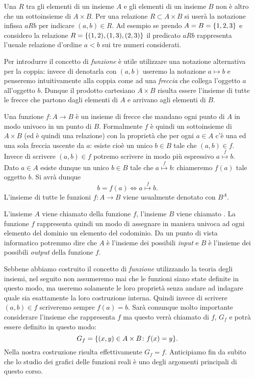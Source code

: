 Una  $R$ tra gli elementi di un insieme $A$ e gli elementi
di un insieme $B$ non è altro che un sottoinsieme di $A\times B$.
Per una relazione $R\subset A\times B$ si userà la notazione infissa
$aRb$ per indicare $(a,b)\in R$.
Ad esempio se prendo $A=B={\left\{ 1,2,3 \right\}}$ e considero la relazione $R={\left\{ (1,2),(1,3),(2,3) \right\}}$
il predicato $aRb$ rappresenta l'usuale relazione d'ordine $a<b$ sui
tre numeri considerati.

Per introdurre il concetto di \emph{funzione} è utile
utilizzare una notazione alternativa per la coppia: invece di denotarla
con $(a,b)$ useremo la notazione $a \mapsto b$ e penseremo intuitivamente
alla coppia come ad una \emph{freccia} che collega l'oggetto $a$
all'oggetto $b$. Dunque il prodotto cartesiano
$A\times B$ risulta essere l'insieme di tutte le frecce che partono dagli
elementi di $A$ e arrivano agli elementi di $B$.

Una funzione $f\colon A \to B$ è un insieme di frecce che mandano
ogni punto di $A$ in modo univoco in un punto di $B$. Formalmente
$f$ è quindi un sottoinsieme di $A\times B$
(ed è quindi una relazione) con la proprietà che
per ogni $a\in A$ c'è una ed una sola freccia uscente da $a$:
esiste cioè un unico $b\in B$ tale che $(a,b)\in f$.
Invece di scrivere $(a,b)\in f$ potremo scrivere in modo più espressivo
$a\stackrel f \mapsto b$.
Dato $a\in A$ esiste dunque un unico $b\in B$ tale che
$a\stackrel f \mapsto b$: chiameremo $f(a)$ tale oggetto $b$.
Si avrà dunque
\[
 b=f(a) \iff a\stackrel f \mapsto b.
\]
L'insieme di tutte le funzioni $f\colon A\to B$ viene usualmente denotato con $B^A$.

L'insieme $A$ viene chiamato  della funzione $f$,
l'insieme $B$ viene chiamato .
La funzione $f$ rappresenta quindi un modo di assegnare in maniera univoca
ad ogni elemento del dominio un elemento del codominio.
Da un punto di vista informatico potremmo dire che $A$ è l'insieme
dei possibili \emph{input} e $B$ è l'insieme dei possibili \emph{output}
della funzione $f$.

Sebbene abbiamo costruito il concetto di \emph{funzione} utilizzando la teoria
degli insiemi, nel seguito non assumeremo mai che le funzioni siano state definite
in questo modo, ma useremo solamente le loro proprietà senza andare ad indagare
quale sia esattamente la loro costruzione interna.
Quindi invece di scrivere $(a,b)\in f$ scriveremo sempre $f(a)=b$.
Sarà comunque molto importante
considerare l'insieme che rappresenta $f$ ma questo verrà chiamato
 di $f$, $G_f$ e potrà essere definito in questo modo:
\[
  G_f = {\left\{ (x,y)\in A \times B\colon f(x)=y \right\}}.
\]
Nella nostra costruzione risulta effettivamente $G_f = f$.
Anticipiamo fin da subito che lo studio dei grafici delle funzioni reali è
uno degli argomenti principali di questo corso.

